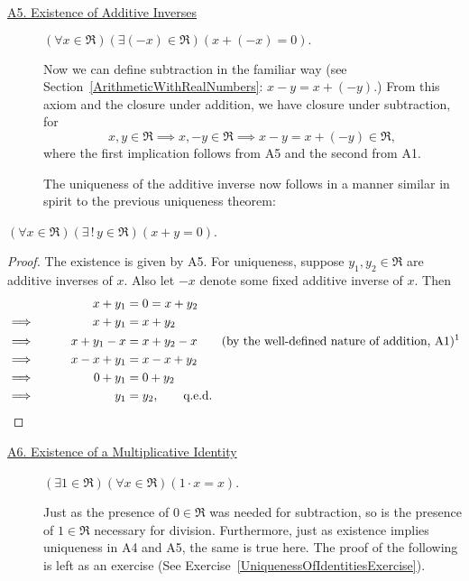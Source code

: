 \begin{description}
\item[\ul{A5. Existence of\vphantom{g} Additive Inverses}] $(\forall x\in\Re) 
(\exists (-x)\in\Re)  (x+(-x)=0).$ 

Now we can define subtraction in the familiar way
(see Section~\ref{ArithmeticWithRealNumbers}:
$x-y=x+(-y)$.)  From this axiom and the closure under
addition, we have
closure under subtraction, for
$$x,y\in\Re\implies x,-y\in\Re\implies x-y=x+(-y)\in\Re,$$
where the first implication follows from A5 and the second from A1.

The uniqueness of the additive inverse now follows in
a manner similar in spirit to the previous uniqueness
theorem:
\end{description}
\begin{theorem} $(\forall x\in\Re)(\exists \,!\, y\in\Re)(x+y=0)$. 
\end{theorem}
\begin{proof}
The existence is given by A5.  For uniqueness, suppose
$y_1,y_2\in\Re$ are additive inverses of $x$.  
Also let $-x$ denote some fixed additive inverse of $x$.
Then 
\begin{alignat*}{2}
&&x+y_1&=0=x+y_2\\
\implies&& x+y_1&=x+y_2\\
\implies&\qquad&x+y_1-x&=x+y_2-x\qquad\text{(by the well-defined nature of
    addition, A1)\footnotemark}\\
\implies&&x-x+y_1&=x-x+y_2\\
\implies&&0+y_1&=0+y_2\\
\implies&&y_1&=y_2,\qquad\text{q.e.d.}
\end{alignat*}\end{proof}
\begin{description}
\item[\ul{A6. Existence of a Multiplicative Identity}] 
$(\exists1\in\Re)(\forall x\in\Re)(1\cdot x=x)$.

Just as the presence of $0\in\Re$ was needed for subtraction,
so is the presence of $1\in\Re$ necessary for division.
Furthermore, just as existence implies uniqueness in
A4 and A5, the same is true here.  The proof of the following
is left as an exercise (See 
Exercise~\ref{UniquenessOfIdentitiesExercise}).
\end{description}
